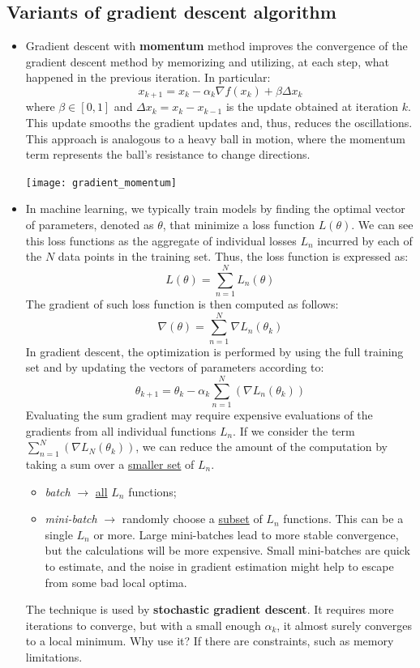 \documentclass{article}
\begin{document}
\subsection{Variants of gradient descent algorithm}
\begin{itemize}
    \item Gradient descent with \textbf{momentum} method improves the
        convergence of the gradient descent method by memorizing and
        utilizing, at each step, what happened in the previous iteration. In
        particular:
        $$x_{k+1}=x_k-\alpha_k\nabla f(x_k)+\beta\Delta x_k$$
        where $\beta\in[0,1]$ and $\Delta x_k=x_k-x_{k-1}$ is the update
        obtained at iteration $k$.
        This update smooths the gradient updates and, thus, reduces the
        oscillations. This approach is analogous to a heavy ball in motion,
        where the momentum term represents the ball's resistance to change
        directions.
        \begin{center}
            \texttt{[image: gradient\_momentum]}
        \end{center}
    \item In machine learning, we typically train models by finding the
        optimal vector of parameters, denoted as $\theta$, that minimize a
        loss function $L(\theta)$. We can see this loss functions as the
        aggregate of individual losses $L_n$ incurred by each of the $N$ data
        points in the training set. Thus, the loss function is expressed as:
        $$L(\theta)=\sum_{n=1}^NL_n(\theta)$$
        The gradient of such loss function is then computed as follows:
        $$\nabla(\theta)=\sum_{n=1}^N\nabla L_n(\theta_k)$$
        In gradient descent, the optimization is performed by using
        the full training set and by updating the vectors of parameters
        according to:
        $$\theta_{k+1}=\theta_k-\alpha_k\sum_{n=1}^N(\nabla L_n(\theta_k))$$
        Evaluating the sum gradient may require expensive evaluations of the
        gradients from all individual functions $L_n$. If we consider the term
        $\sum_{n=1}^N(\nabla L_N(\theta_k))$, we can reduce the amount of the
        computation by taking a sum over a \underline{smaller set} of $L_n$.
        \begin{itemize}
            \item \textit{batch} $\to$ \underline{all} $L_n$ functions;
            \item \textit{mini-batch} $\to$ randomly choose a
                \underline{subset} of $L_n$
                functions. This can be a single $L_n$ or more. Large
                mini-batches lead to more stable convergence, but the
                calculations will be more expensive. Small mini-batches are
                quick to estimate, and the noise in gradient estimation might
                help to escape from some bad local optima.
        \end{itemize}
        The technique is used by \textbf{stochastic gradient descent}. It
        requires more iterations to converge, but with a small enough
        $\alpha_k$, it almost surely converges to a local minimum. Why use it?
        If there are constraints, such as memory limitations.


\end{itemize}
\end{document}
